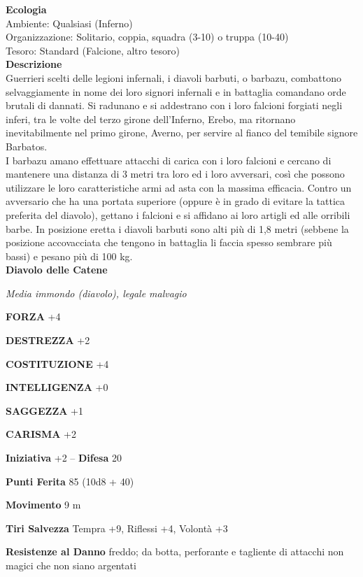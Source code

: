 \begin{multicols}{2}
\textbf{Ecologia}\\
Ambiente: Qualsiasi (Inferno)\\
Organizzazione: Solitario, coppia, squadra (3-10) o truppa (10-40)\\
Tesoro: Standard (Falcione, altro tesoro)\\
\textbf{Descrizione}\\
Guerrieri scelti delle legioni infernali, i diavoli barbuti, o barbazu, combattono selvaggiamente in nome dei loro signori infernali e in battaglia comandano orde brutali di dannati. Si radunano e si addestrano con i loro falcioni forgiati negli inferi, tra le volte del terzo girone dell'Inferno, Erebo, ma ritornano inevitabilmente nel primo girone, Averno, per servire al fianco del temibile signore Barbatos.\\
I barbazu amano effettuare attacchi di carica con i loro falcioni e cercano di mantenere una distanza di 3 metri tra loro ed i loro avversari, così che possono utilizzare le loro caratteristiche armi ad asta con la massima efficacia. Contro un avversario che ha una portata superiore (oppure è in grado di evitare la tattica preferita del diavolo), gettano i falcioni e si affidano ai loro artigli ed alle orribili barbe. In posizione eretta i diavoli barbuti sono alti più di 1,8 metri (sebbene la posizione accovacciata che tengono in battaglia li faccia spesso sembrare più bassi) e pesano più di 100 kg.\\


\medskip{}\textbf{Diavolo delle Catene}

\emph{Media immondo (diavolo), legale malvagio}

\textbf{FORZA} +4

\textbf{DESTREZZA} +2

\textbf{COSTITUZIONE} +4

\textbf{INTELLIGENZA} +0

\textbf{SAGGEZZA} +1

\textbf{CARISMA} +2

\textbf{Iniziativa} +2 -- \textbf{Difesa} 20

\textbf{Punti Ferita} 85 (10d8 + 40)

\textbf{Movimento} 9 m

\textbf{Tiri Salvezza} Tempra +9, Riflessi +4, Volontà +3

\textbf{Resistenze al Danno} freddo; da botta, perforante e tagliente di attacchi non magici che non siano argentati


\end{multicols}
